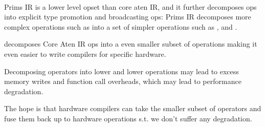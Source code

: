\begin{defnbox}\nospacing
    \begin{defn}\label{defn:prim_ir}\leavevmode\\
        Prims IR is a lower level opset than core aten IR, and it further decomposes ops into explicit type promotion and broadcasting ops:
        Prims IR decomposes more complex operations such as  into a set of simpler operations
        such as ,  and .
    \end{defn}
\end{defnbox}
\begin{sectionbox}\nospacing
   \begin{proslist}
       \item decomposes Core Aten IR ops into a even smaller subset of operations making it even easier to write compilers for specific hardware.
   \end{proslist}
   \begin{conslist}
       \item Decomposing operators into lower and lower operations may lead to excess memory writes and function call overheads,
       which may lead to performance degradation.
   \end{conslist}
\end{sectionbox}
\begin{notebox}[Note]\nospacing
    The hope is that hardware compilers can take the smaller subset of operators and fuse them back up to hardware operations s.t. we don't
    suffer any degradation.
\end{notebox}
